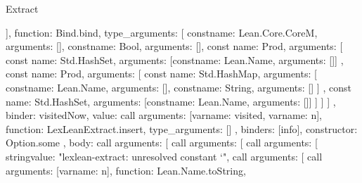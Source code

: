 \begin{lexlean}{Extract}
\begin{toolingmodule}
{{{{{{{{{{{{{                                }
                              }
                            }
                          ],
                          function: Bind.bind,
                          type_arguments: [
                            const{name: Lean.Core.CoreM, arguments: []},
                            const{name: Bool, arguments: []},
                            const{
                              name: Prod,
                              arguments: [
                                const{
                                  name: Std.HashSet,
                                  arguments: [const{name: Lean.Name, arguments: []}]
                                },
                                const{
                                  name: Prod,
                                  arguments: [
                                    const{
                                      name: Std.HashMap,
                                      arguments: [
                                        const{name: Lean.Name, arguments: []},
                                        const{name: String, arguments: []}
                                      ]
                                    },
                                    const{
                                      name: Std.HashSet,
                                      arguments: [const{name: Lean.Name, arguments: []}]
                                    }
                                  ]
                                }
                              ]
                            }
                          ]
                        }
                      },
                      binder: visitedNow,
                      value: call{
                        arguments: [var{name: visited}, var{name: n}],
                        function: LexLeanExtract.insert,
                        type_arguments: []
                      }
                    },
                    binders: [info],
                    constructor: Option.some
                  },
                  {
                    body: call{
                      arguments: [
                        call{
                          arguments: [
                            call{
                              arguments: [
                                string{value: "lexlean-extract: unresolved constant `"},
                                call{
                                  arguments: [
                                    call{
                                      arguments: [var{name: n}],
                                      function: Lean.Name.toString,
}}}}}}}}}}}}
\end{toolingmodule}
\end{lexlean}
